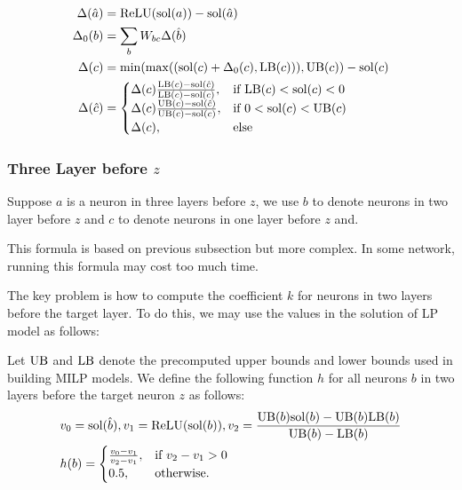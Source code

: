 \begin{align*}
	\Delta(\hat{a}) &= \mathrm{ReLU}(\mathrm{sol}(a))-\mathrm{sol}(\hat{a})\\
	\Delta_0(b) &= \sum_{b} W_{bc}\Delta(\hat{b})\\
		\Delta(c) &= \min(\max((\mathrm{sol}(c)+\Delta_0(c),\mathrm{LB}(c))),\mathrm{UB}(c))-\mathrm{sol}(c)\\
		\Delta(\hat{c}) &=
		\begin{cases}
		\Delta(c)\frac{\mathrm{LB}(c) - \mathrm{sol}(\hat{c})}{\mathrm{LB}(c) - \mathrm{sol}(c)},  &\text{if } \mathrm{LB}(c)< \mathrm{sol}(c) < 0\\
		\Delta(c)\frac{\mathrm{UB}(c) - \mathrm{sol}(\hat{c})}{\mathrm{UB}(c) - \mathrm{sol}(c)},  &\text{if }  0< \mathrm{sol}(c) < \mathrm{UB}(c)\\
			\Delta(c),  &\text{else } 	 
		\end{cases}
\end{align*}


\subsubsection*{Three Layer before  $z$} 

Suppose $a$ is a neuron in three layers before $z$, we use $b$ to denote neurons in two layer before $z$ and $c$ to denote neurons in one layer before $z$ and. 

This formula is based on previous subsection but more complex. In some network, running this formula may cost too much time. 

The key problem is how to compute the coefficient $k$ for neurons in two layers before the target layer. To do this, we may use the values in the solution of LP model as follows:

\begin{definition}\label{3layer}
Let $\mathrm{UB}$ and $\mathrm{LB}$ denote the precomputed upper bounds and lower bounds used in building MILP models. We define the following function $h$ for all neurons $b$ in two layers before the target neuron $z$ as follows:
	\begin{align}
		&v_0 = \mathrm{sol}(\hat{b}), v_1 = \mathrm{ReLU}(\mathrm{sol}(b)), v_2 = \frac{\mathrm{UB}(b)\mathrm{sol}(b)-\mathrm{UB}(b)\mathrm{LB}(b)}{\mathrm{UB}(b)-\mathrm{LB}(b)}\\
		&h(b) =
		\begin{cases}
			\frac{v_0-v_1}{v_2-v_1}, & \text{if } v_2-v_1 > 0\\
			0.5, & \text{otherwise.}
		\end{cases}
	\end{align} 
\end{definition} 

